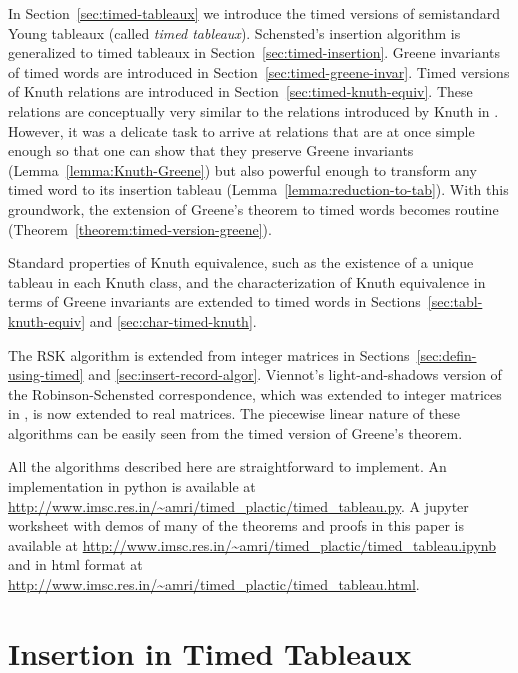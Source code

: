 \documentclass[10pt]{amsproc}
\theoremstyle{definition}
\theoremstyle{remark}
\begin{document}
In Section~\ref{sec:timed-tableaux} we introduce the timed versions of semistandard Young tableaux (called \emph{timed tableaux}). 
Schensted's insertion algorithm is generalized to timed tableaux in Section~\ref{sec:timed-insertion}.
Greene invariants of timed words are introduced in Section~\ref{sec:timed-greene-invar}.
Timed versions of Knuth relations are introduced in Section~\ref{sec:timed-knuth-equiv}. 
These relations are conceptually very similar to the relations introduced by Knuth in \cite{knuth}.
However, it was a delicate task to arrive at relations that are at once simple enough so that one can show that they preserve Greene invariants (Lemma~\ref{lemma:Knuth-Greene}) but also powerful enough to transform any timed word to its insertion tableau (Lemma~\ref{lemma:reduction-to-tab}).
With this groundwork, the extension of Greene's theorem to timed words becomes routine (Theorem~\ref{theorem:timed-version-greene}).

Standard properties of Knuth equivalence, such as the existence of a unique tableau in each Knuth class, and the characterization of Knuth equivalence in terms of Greene invariants are extended to timed words in Sections~\ref{sec:tabl-knuth-equiv} and \ref{sec:char-timed-knuth}.

The RSK algorithm \cite{knuth} is extended from integer matrices in Sections~\ref{sec:defin-using-timed} and \ref{sec:insert-record-algor}.
Viennot's light-and-shadows version of the Robinson-Schensted correspondence, which was extended to integer matrices in \cite{rtcv}, is now extended to real matrices.
The piecewise linear nature of these algorithms can be easily seen from the timed version of Greene's theorem.

All the algorithms described here are straightforward to implement.
An implementation in python is available at \url{http://www.imsc.res.in/~amri/timed_plactic/timed_tableau.py}. A jupyter worksheet with demos of many of the theorems and proofs in this paper is available at \url{http://www.imsc.res.in/~amri/timed_plactic/timed_tableau.ipynb} and in html format at \url{http://www.imsc.res.in/~amri/timed_plactic/timed_tableau.html}.
\section{Insertion in Timed Tableaux}
\label{sec:insertion}
\end{document}
